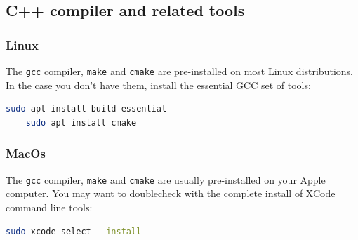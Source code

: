 \subsection{C++ compiler and related tools}\label{sec:C++}

\subsubsection{Linux}

The \texttt{gcc} compiler, \texttt{make} and \texttt{cmake} are pre-installed on most Linux distributions. In the case you don't have them, install the essential GCC set of tools:
    \begin{lstlisting}[language=bash]
	sudo apt install build-essential
	sudo apt install cmake
    \end{lstlisting}
\subsubsection{MacOs}
The \texttt{gcc} compiler, \texttt{make} and \texttt{cmake} are usually pre-installed on your Apple computer. You may want to doublecheck with the complete install of XCode command line tools:\\
    \begin{lstlisting}[language=bash]
        sudo xcode-select --install
    \end{lstlisting}

